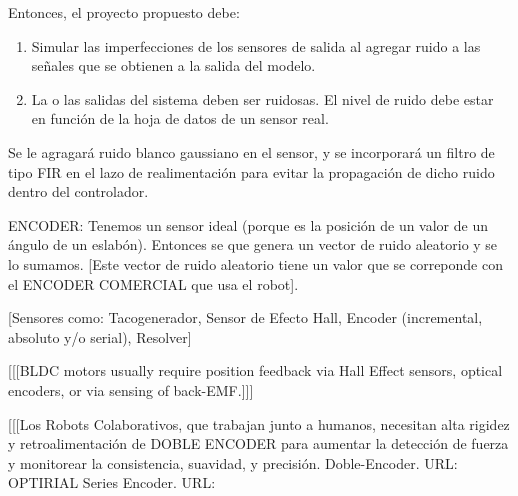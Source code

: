\documentclass{article}
\begin{document}
\begin{sloppypar}
Entonces, el proyecto propuesto debe:

\begin{enumerate}

    \item Simular las imperfecciones de los sensores de salida al agregar ruido a las señales que se obtienen a la salida del modelo.

    \item La o las salidas del sistema deben ser ruidosas. El nivel de ruido debe estar en función de la hoja de datos de un sensor real.
\end{enumerate}

Se le agragará ruido blanco gaussiano en el sensor, y se incorporará un filtro de tipo FIR en el lazo de realimentación para evitar la propagación de dicho ruido dentro del controlador.



ENCODER: Tenemos un sensor ideal (porque es la posición de un valor de un ángulo de un eslabón). Entonces se que genera un vector de ruido aleatorio y se lo sumamos. [Este vector de ruido aleatorio tiene un valor que se correponde con el ENCODER COMERCIAL que usa el robot].

[Sensores como: Tacogenerador, Sensor de Efecto Hall, Encoder (incremental, absoluto y/o serial), Resolver]

[[[BLDC motors usually require position feedback via Hall Effect sensors, optical encoders, or via sensing of back-EMF.]]] %


[[[Los Robots Colaborativos, que trabajan junto a humanos, necesitan alta rigidez y retroalimentación de DOBLE ENCODER para aumentar la detección de fuerza y monitorear la consistencia, suavidad, y precisión. Doble-Encoder. URL: %
OPTIRIAL Series Encoder. URL: %










\end{sloppypar}
\end{document}
